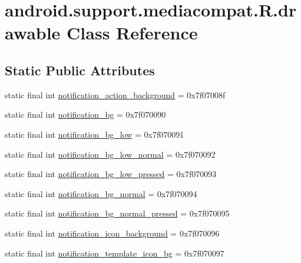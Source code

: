 \hypertarget{classandroid_1_1support_1_1mediacompat_1_1R_1_1drawable}{}\section{android.\+support.\+mediacompat.\+R.\+drawable Class Reference}
\label{classandroid_1_1support_1_1mediacompat_1_1R_1_1drawable}
\subsection*{Static Public Attributes}
\begin{DoxyCompactItemize}
\item 
static final int \mbox{\hyperlink{classandroid_1_1support_1_1mediacompat_1_1R_1_1drawable_a0b69d61f065c3d3b73b5eca274c167f9}{notification\+\_\+action\+\_\+background}} = 0x7f07008f
\item 
static final int \mbox{\hyperlink{classandroid_1_1support_1_1mediacompat_1_1R_1_1drawable_a5fb8e7e3a4bf4505e571d6104e0e1461}{notification\+\_\+bg}} = 0x7f070090
\item 
static final int \mbox{\hyperlink{classandroid_1_1support_1_1mediacompat_1_1R_1_1drawable_a372ba0df90d8b0b0c4577254c4c3ca7e}{notification\+\_\+bg\+\_\+low}} = 0x7f070091
\item 
static final int \mbox{\hyperlink{classandroid_1_1support_1_1mediacompat_1_1R_1_1drawable_a83c51af2a9b8ef8129e3ae3769041cac}{notification\+\_\+bg\+\_\+low\+\_\+normal}} = 0x7f070092
\item 
static final int \mbox{\hyperlink{classandroid_1_1support_1_1mediacompat_1_1R_1_1drawable_abf84a1a876f0f923353c2adf76e5c0f8}{notification\+\_\+bg\+\_\+low\+\_\+pressed}} = 0x7f070093
\item 
static final int \mbox{\hyperlink{classandroid_1_1support_1_1mediacompat_1_1R_1_1drawable_a797788319e55c825d7ac2cf98a5e4f05}{notification\+\_\+bg\+\_\+normal}} = 0x7f070094
\item 
static final int \mbox{\hyperlink{classandroid_1_1support_1_1mediacompat_1_1R_1_1drawable_aec937cb8ac9686211ac4856d542982ae}{notification\+\_\+bg\+\_\+normal\+\_\+pressed}} = 0x7f070095
\item 
static final int \mbox{\hyperlink{classandroid_1_1support_1_1mediacompat_1_1R_1_1drawable_a0accf2aaf207d148b48d1b971fba6fbd}{notification\+\_\+icon\+\_\+background}} = 0x7f070096
\item 
static final int \mbox{\hyperlink{classandroid_1_1support_1_1mediacompat_1_1R_1_1drawable_aa77a7cf8c2a1c4c4cb8b2ad8695df81e}{notification\+\_\+template\+\_\+icon\+\_\+bg}} = 0x7f070097

\end{DoxyCompactItemize}
